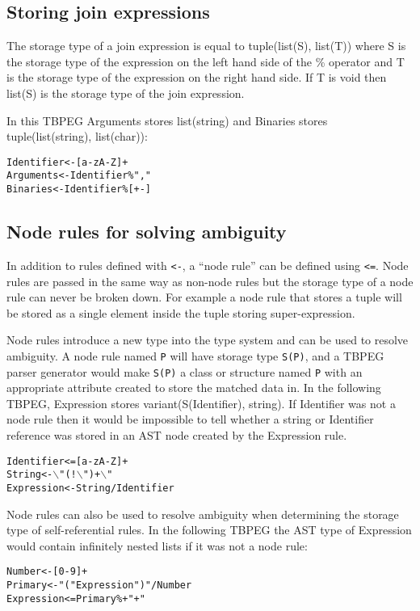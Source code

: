\documentclass[a4paper,11pt]{article}
\begin{document}
\subsection{Storing join expressions}
The storage type of a join expression is equal to tuple(list(S), list(T)) where S is the storage type of the expression on the left hand side of the \% operator and T is the storage type of the expression on the right hand side. If T is void then list(S) is the storage type of the join expression.

In this TBPEG Arguments stores list(string) and Binaries stores tuple(list(string), list(char)):
\begin{alltt}
    Identifier <- [a-zA-Z]+
    Arguments  <- Identifier \% ","
    Binaries   <- Identifier \% [+-]
\end{alltt}

\subsection{Node rules for solving ambiguity}
In addition to rules defined with \verb+<-+, a ``node rule'' can be defined using \verb+<=+.
Node rules are passed in the same way as non-node rules but the storage type of a node rule can never be broken down.
For example a node rule that stores a tuple will be stored as a single element inside the tuple storing super-expression.

Node rules introduce a new type into the type system and can be used to resolve ambiguity.
A node rule named \verb+P+ will have storage type \verb+S(P)+, and a TBPEG parser generator would make \verb+S(P)+ a class or structure named \verb+P+ with an appropriate attribute created to store the matched data in.
In the following TBPEG, Expression stores variant(S(Identifier), string).
If Identifier was not a node rule then it would be impossible to tell whether a string or Identifier reference was stored in an AST node created by the Expression rule.
\begin{alltt}
    Identifier   <= [a-zA-Z]+
    String       <- \(\backslash\)"  (! \(\backslash\)")+ \(\backslash\)"
    Expression   <- String / Identifier
\end{alltt}

Node rules can also be used to resolve ambiguity when determining the storage type of self-referential rules.
In the following TBPEG the AST type of Expression would contain infinitely nested lists if it was not a node rule:
\begin{alltt}
    Number     <- [0-9]+
    Primary    <- "(" Expression ")" / Number
    Expression <= Primary \%+ "+"
\end{alltt}
\end{document}
